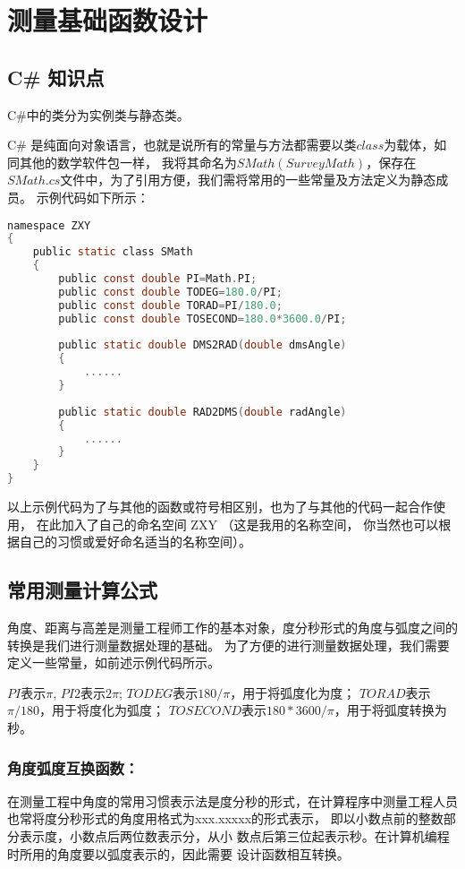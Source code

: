 
\chapter{测量基础函数设计}

\section{C\# 知识点}
C\#中的类分为实例类与静态类。

C\# 是纯面向对象语言，也就是说所有的常量与方法都需要以类$class$为载体，如同其他的数学软件包一样，
我将其命名为$SMath(SurveyMath)$，保存在$SMath.cs$文件中，为了引用方便，我们需将常用的一些常量及方法定义为静态成员。
示例代码如下所示：
\begin{lstlisting}[language=C]
namespace ZXY
{
    public static class SMath
    {
        public const double PI=Math.PI;
        public const double TODEG=180.0/PI; 
        public const double TORAD=PI/180.0;
        public const double TOSECOND=180.0*3600.0/PI;
    
        public static double DMS2RAD(double dmsAngle)
        {
            ......
        }
    
        public static double RAD2DMS(double radAngle)
        {
            ......
        }
    }
}
\end{lstlisting}

以上示例代码为了与其他的函数或符号相区别，也为了与其他的代码一起合作使用，
在此加入了自己的命名空间 ZXY （这是我用的名称空间，
你当然也可以根据自己的习惯或爱好命名适当的名称空间）。

\section{常用测量计算公式}
角度、距离与高差是测量工程师工作的基本对象，度分秒形式的角度与弧度之间的转换是我们进行测量数据处理的基础。
为了方便的进行测量数据处理，我们需要定义一些常量，如前述示例代码所示。

$PI$表示$\pi$, $PI2$表示$2\pi$;
$TODEG$表示$180/\pi$，用于将弧度化为度；
$TORAD$表示$\pi/180$，用于将度化为弧度；
$TOSECOND$表示$180*3600/\pi$，用于将弧度转换为秒。

\subsection{角度弧度互换函数：}

 在测量工程中角度的常用习惯表示法是度分秒的形式，在计算程序中测量工程人员也常将度分秒形式的角度用格式为xxx.xxxxx的形式表示，
 即以小数点前的整数部分表示度，小数点后两位数表示分，从小
 数点后第三位起表示秒。在计算机编程时所用的角度要以弧度表示的，因此需要
 设计函数相互转换。

